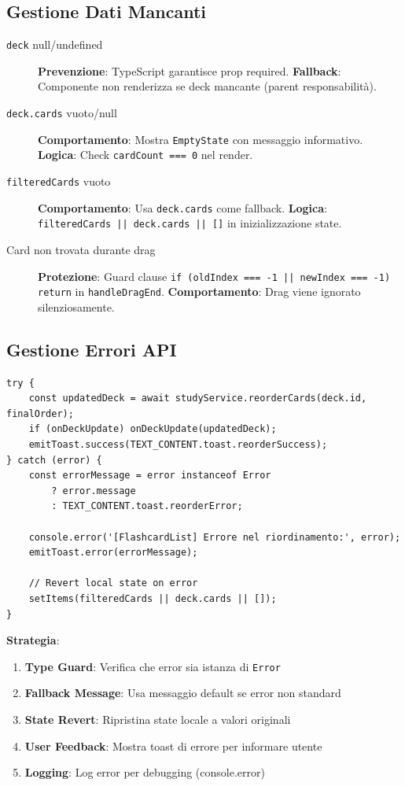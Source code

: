 \documentclass[11pt,a4paper]{article}
\begin{document}
\subsection{Gestione Dati Mancanti}

\begin{description}
    \item[\texttt{deck} null/undefined] \textbf{Prevenzione}: TypeScript garantisce prop required. \textbf{Fallback}: Componente non renderizza se deck mancante (parent responsabilità).
    
    \item[\texttt{deck.cards} vuoto/null] \textbf{Comportamento}: Mostra \texttt{EmptyState} con messaggio informativo. \textbf{Logica}: Check \texttt{cardCount === 0} nel render.
    
    \item[\texttt{filteredCards} vuoto] \textbf{Comportamento}: Usa \texttt{deck.cards} come fallback. \textbf{Logica}: \texttt{filteredCards || deck.cards || []} in inizializzazione state.
    
    \item[Card non trovata durante drag] \textbf{Protezione}: Guard clause \texttt{if (oldIndex === -1 || newIndex === -1) return} in \texttt{handleDragEnd}. \textbf{Comportamento}: Drag viene ignorato silenziosamente.
\end{description}

\subsection{Gestione Errori API}

\begin{lstlisting}[style=typescript, caption=Error Handling Pattern]
try {
    const updatedDeck = await studyService.reorderCards(deck.id, finalOrder);
    if (onDeckUpdate) onDeckUpdate(updatedDeck);
    emitToast.success(TEXT_CONTENT.toast.reorderSuccess);
} catch (error) {
    const errorMessage = error instanceof Error 
        ? error.message 
        : TEXT_CONTENT.toast.reorderError;
    
    console.error('[FlashcardList] Errore nel riordinamento:', error);
    emitToast.error(errorMessage);
    
    // Revert local state on error
    setItems(filteredCards || deck.cards || []);
}
\end{lstlisting}

\textbf{Strategia}:
\begin{enumerate}
    \item \textbf{Type Guard}: Verifica che error sia istanza di \texttt{Error}
    \item \textbf{Fallback Message}: Usa messaggio default se error non standard
    \item \textbf{State Revert}: Ripristina state locale a valori originali
    \item \textbf{User Feedback}: Mostra toast di errore per informare utente
    \item \textbf{Logging}: Log error per debugging (console.error)
\end{enumerate}
\end{document}
